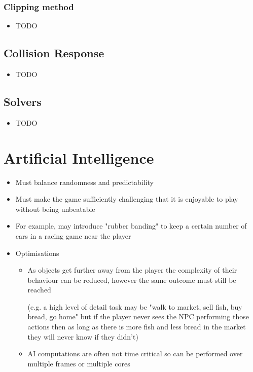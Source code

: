 \documentclass[a4paper]{article}
\begin{document}
\subsubsection{Clipping method}

\begin{itemize}
  \item
    TODO

\end{itemize}

\subsection{Collision Response}

\begin{itemize}
  \item
    TODO

\end{itemize}

\subsection{Solvers}

\begin{itemize}
  \item
    TODO

\end{itemize}

\section{Artificial Intelligence}

\begin{itemize}
  \item
    Must balance randomness and predictability

  \item
    Must make the game sufficiently challenging that it is enjoyable to play
    without being unbeatable

  \item
    For example, may introduce "rubber banding" to keep a certain number of cars
    in a racing game near the player

  \item
    Optimisations
    \begin{itemize}
      \item
        As objects get further away from the player the complexity of their
        behaviour can be reduced, however the same outcome must still be reached

        (e.g. a high level of detail task may be "walk to market, sell fish, buy
        bread, go home" but if the player never sees the NPC performing those
        actions then as long as there is more fish and less bread in the market
        they will never know if they didn't)

      \item
        AI computations are often not time critical so can be performed over
        multiple frames or multiple cores

    \end{itemize}

\end{itemize}
\end{document}
